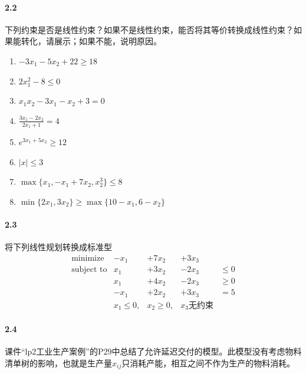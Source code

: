 \documentclass[12pt,a4paper]{article}
\begin{document}
\paragraph{2.2}

下列约束是否是线性约束？如果不是线性约束，能否将其等价转换成线性约束？如果能转化，请展示；如果不能，说明原因。
\begin{enumerate}
	
	\item $ -3x_1-5x_2+22 \geq 18$
	
	\item $2x_1^2 -8 \leq 0$
	
	\item $x_1x_2-3x_1-x_2+3=0$
	
	\item $\frac{3x_1-2x_2}{2x_1+1} = 4$
	
	\item $e^{3x_1+5x_2} \geq 12$
	
	\item $|x| \leq 3$
	
	\item $\max\{x_1, -x_1+7x_2, x_2^3\} \leq 8$
	
	\item $\min\{2x_1,3x_2\} \geq \max\{10-x_1,6-x_2\}$
	
	
\end{enumerate}

\paragraph{2.3}
将下列线性规划转换成标准型
\begin{equation*}
	\begin{aligned}
	\text{minimize}  & -x_1&+7x_2 &+3x_3 &\\
	\text{subject to}& x_1 &+3x_2  &-2x_3    &\leq 0 \\
	&x_1 &+4x_2  &-2x_3  &\geq 0  \\
	&-x_1 &+2x_2  &+3x_3    &=  5  \\
	&x_1 \leq 0, &x_2 \geq 0, &x_3  \text{无约束}&  
	\end{aligned}
\end{equation*}




\paragraph{2.4}
课件“lp2工业生产案例”的P29中总结了允许延迟交付的模型。此模型没有考虑物料清单树的影响，也就是生产量$x_{ij}$只消耗产能，相互之间不作为生产的物料消耗。
\end{document}
